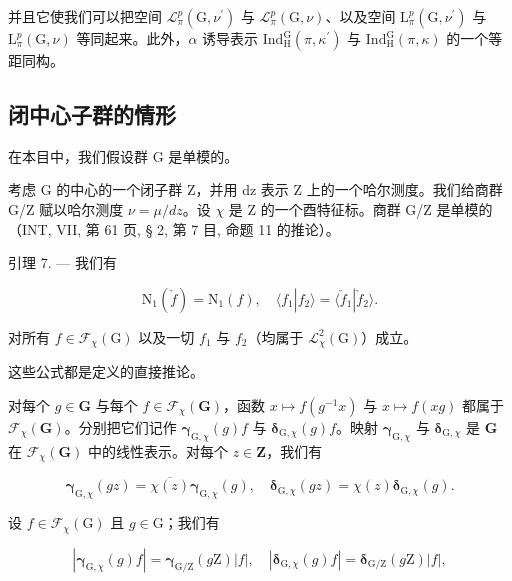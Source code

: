并且它使我们可以把空间 \(\mathcal{L}_{\pi}^{p}(\mathrm{G},\nu^{\prime})\) 与 \(\mathcal{L}_{\pi}^{p}(\mathrm{G},\nu)\)、以及空间 \(\mathrm{L}_{\pi}^{p}(\mathrm{G},\nu^{\prime})\) 与 \(\mathrm{L}_{\pi}^{p}(\mathrm{G},\nu)\) 等同起来。此外，\(\alpha\) 诱导表示 \(\mathrm{Ind}_{\mathrm{H}}^{\mathrm{G}}(\pi,\kappa^{\prime})\) 与 \(\mathrm{Ind}_{\mathrm{H}}^{\mathrm{G}}(\pi,\kappa)\) 的一个等距同构。

\subsection{闭中心子群的情形}

在本目中，我们假设群 G 是单模的。

 考虑 G 的中心的一个闭子群 Z，并用 dz 表示 Z 上的一个哈尔测度。我们给商群 G/Z 赋以哈尔测度 \(\nu = \mu/dz\)。设 \(\chi\) 是 Z 的一个酉特征标。商群 G/Z 是单模的（INT, VII, 第 61 页, § 2, 第 7 目, 命题 11 的推论）。

引理 7. --- 我们有

\[
\mathrm{N} _ {1} (\check {f}) = \mathrm{N} _ {1} (f), \quad \langle f _ {1} | f _ {2} \rangle = \langle \check {f} _ {1} | \check {f} _ {2} \rangle .\tag{6}
\]

对所有 \(f \in \mathcal{F}_{\chi}(\mathrm{G})\) 以及一切 \(f_1\) 与 \(f_2\)（均属于 \(\mathcal{L}_{\chi}^{2}(\mathrm{G})\)）成立。

这些公式都是定义的直接推论。

 对每个 \(g \in \mathbf{G}\) 与每个 \(f \in \mathcal{F}_{\chi}(\mathbf{G})\)，函数 \(x \mapsto f(g^{-1}x)\) 与 \(x \mapsto f(xg)\) 都属于 \(\mathcal{F}_{\chi}(\mathbf{G})\)。分别把它们记作 \(\boldsymbol{\gamma}_{\mathrm{G},\chi}(g)f\) 与 \(\boldsymbol{\delta}_{\mathrm{G},\chi}(g)f\)。映射 \(\boldsymbol{\gamma}_{\mathrm{G},\chi}\) 与 \(\boldsymbol{\delta}_{\mathrm{G},\chi}\) 是 \(\mathbf{G}\) 在 \(\mathcal{F}_{\chi}(\mathbf{G})\) 中的线性表示。对每个 \(z \in \mathbf{Z}\)，我们有

\[
\boldsymbol {\gamma} _ {\mathrm{G}, \chi} (g z) = \overline {{\chi (z)}} \boldsymbol {\gamma} _ {\mathrm{G}, \chi} (g), \quad \boldsymbol {\delta} _ {\mathrm{G}, \chi} (g z) = \chi (z) \boldsymbol {\delta} _ {\mathrm{G}, \chi} (g).\tag{7}
\]

设 \(f\in \mathcal{F}_{\chi}(\mathrm{G})\) 且 \(g\in \mathrm{G}\)；我们有

\[
| \boldsymbol {\gamma} _ {\mathrm{G}, \chi} (g) f | = \boldsymbol {\gamma} _ {\mathrm{G} / \mathrm{Z}} (g \mathrm{Z}) | f |, \quad | \boldsymbol {\delta} _ {\mathrm{G}, \chi} (g) f | = \boldsymbol {\delta} _ {\mathrm{G} / \mathrm{Z}} (g \mathrm{Z}) | f |,\tag{8}
\]

